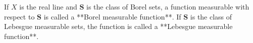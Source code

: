 If $X$ is the real line and $\mathbf{S}$ is the class of Borel sets, a function measurable with respect to $\mathbf{S}$ is called a **Borel measurable function**. If $\mathbf{S}$ is the class of Lebesgue measurable sets, the function is called a **Lebesgue measurable function**.
